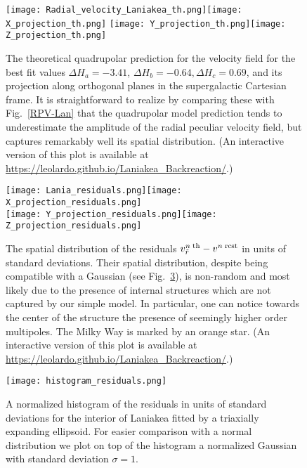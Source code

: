 \documentclass[notitlepage,nofootinbib]{revtex4-1}
\begin{document}
\begin{figure}[h]
    \centering
	\texttt{[image: Radial\_velocity\_Laniakea\_th.png]}\texttt{[image: X\_projection\_th.png]} \texttt{[image: Y\_projection\_th.png]}\texttt{[image: Z\_projection\_th.png]}
	\caption{The theoretical quadrupolar prediction for the velocity field for the best fit values $\Delta H_a = -3.41$, $\Delta H_b = -0.64, \Delta H_c = 0.69 $, and its projection along orthogonal planes in the supergalactic Cartesian frame. It is straightforward to realize by comparing these with Fig.~\ref{RPV-Lan}  that the quadrupolar model prediction tends to underestimate the amplitude of the radial peculiar velocity field, but captures remarkably well  its spatial distribution. (An interactive version of this plot is available  at \href{https://leolardo.github.io/Laniakea_Backreaction/}{https://leolardo.github.io/Laniakea\_Backreaction/}.)}
	\label{VelMap}
\end{figure}
\begin{figure}[h]
    \centering
	\texttt{[image: Lania\_residuals.png]}\texttt{[image: X\_projection\_residuals.png]}\\
 \texttt{[image: Y\_projection\_residuals.png]}\texttt{[image: Z\_projection\_residuals.png]}
	\caption{The spatial distribution of the residuals $v^{n\;\rm{th}}_{\tilde{r}} -v^{n\;\rm{rcst}}$ in units of standard deviations. Their spatial distribution, despite being compatible with a Gaussian (see Fig.~\ref{ResCen}), is non-random and most likely due to the presence of internal structures which are not captured by our simple model. In particular, one can notice towards the center of the structure the presence of seemingly higher order multipoles.  The Milky Way is marked by an orange star. (An interactive version of this plot is available at \href{https://leolardo.github.io/Laniakea_Backreaction/}{https://leolardo.github.io/Laniakea\_Backreaction/}.)}
	\label{ResDistSpace}
\end{figure}
\begin{figure}[h]
    \centering
	\texttt{[image: histogram\_residuals.png]}\\
	\caption{A normalized histogram of the residuals in units of standard deviations for the interior of Laniakea fitted by a triaxially expanding ellipsoid. For easier comparison with a normal distribution we plot on top of the histogram a normalized Gaussian with standard deviation $\sigma=1$.}
	\label{ResCen}
\end{figure}
\end{document}
